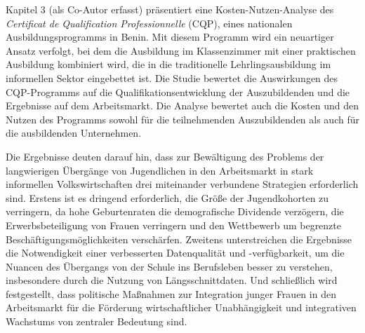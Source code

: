 Kapitel 3 (als Co-Autor erfasst) präsentiert eine Kosten-Nutzen-Analyse des \textit{Certificat de Qualification Professionnelle} (CQP), eines nationalen Ausbildungsprogramms in Benin. Mit diesem Programm wird ein neuartiger Ansatz verfolgt, bei dem die Ausbildung im Klassenzimmer mit einer praktischen Ausbildung kombiniert wird, die in die traditionelle Lehrlingsausbildung im informellen Sektor eingebettet ist. Die Studie bewertet die Auswirkungen des CQP-Programms auf die Qualifikationsentwicklung der Auszubildenden und die Ergebnisse auf dem Arbeitsmarkt. Die Analyse bewertet auch die Kosten und den Nutzen des Programms sowohl für die teilnehmenden Auszubildenden als auch für die ausbildenden Unternehmen.

Die Ergebnisse deuten darauf hin, dass zur Bewältigung des Problems der langwierigen Übergänge von Jugendlichen in den Arbeitsmarkt in stark informellen Volkswirtschaften drei miteinander verbundene Strategien erforderlich sind. Erstens ist es dringend erforderlich, die Größe der Jugendkohorten zu verringern, da hohe Geburtenraten die demografische Dividende verzögern, die Erwerbsbeteiligung von Frauen verringern und den Wettbewerb um begrenzte Beschäftigungsmöglichkeiten verschärfen. Zweitens unterstreichen die Ergebnisse die Notwendigkeit einer verbesserten Datenqualität und -verfügbarkeit, um die Nuancen des Übergangs von der Schule ins Berufsleben besser zu verstehen, insbesondere durch die Nutzung von Längsschnittdaten. Und schließlich wird festgestellt, dass politische Maßnahmen zur Integration junger Frauen in den Arbeitsmarkt für die Förderung wirtschaftlicher Unabhängigkeit und integrativen Wachstums von zentraler Bedeutung sind.